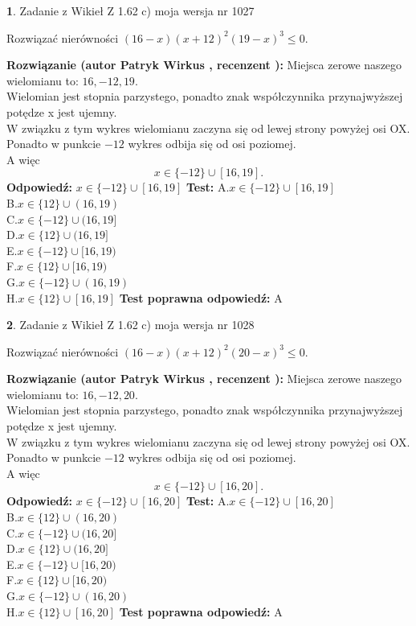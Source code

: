 \documentclass[12pt, a4paper]{article}
\theoremstyle{definition} %
\newtheorem{zad}{}
\newcommand{\zadStart}[1]{\begin{zad}#1\newline}
\newcommand{\zadStop}{\end{zad}}
\newcommand{\rozwStart}[2]{\noindent \textbf{Rozwiązanie (autor #1 , recenzent #2): }\newline}
\newcommand{\rozwStop}{\newline}
\newcommand{\odpStart}{\noindent \textbf{Odpowiedź:}\newline}
\newcommand{\odpStop}{\newline}
\newcommand{\testStart}{\noindent \textbf{Test:}\newline}
\newcommand{\testStop}{\newline}
\newcommand{\kluczStart}{\noindent \textbf{Test poprawna odpowiedź:}\newline}
\newcommand{\kluczStop}{\newline}
\begin{document}
\zadStart{Zadanie z Wikieł Z 1.62 c) moja wersja nr 1027}

Rozwiązać nierówności $(16-x)(x+12)^{2}(19-x)^{3}\le0$.
\zadStop
\rozwStart{Patryk Wirkus}{}
Miejsca zerowe naszego wielomianu to: $16, -12, 19$.\\
Wielomian jest stopnia parzystego, ponadto znak współczynnika przy\linebreak najwyższej potędze x jest ujemny.\\ W związku z tym wykres wielomianu zaczyna się od lewej strony powyżej osi OX.\\
Ponadto w punkcie $-12$ wykres odbija się od osi poziomej.\\
A więc $$x \in \{-12\} \cup [16,19].$$
\rozwStop
\odpStart
$x \in \{-12\} \cup [16,19]$
\odpStop
\testStart
A.$x \in \{-12\} \cup [16,19]$\\
B.$x \in \{12\} \cup (16,19)$\\
C.$x \in \{-12\} \cup (16,19]$\\
D.$x \in \{12\} \cup (16,19]$\\
E.$x \in \{-12\} \cup [16,19)$\\
F.$x \in \{12\} \cup [16,19)$\\
G.$x \in \{-12\} \cup (16,19)$\\
H.$x \in \{12\} \cup [16,19]$
\testStop
\kluczStart
A
\kluczStop



\zadStart{Zadanie z Wikieł Z 1.62 c) moja wersja nr 1028}

Rozwiązać nierówności $(16-x)(x+12)^{2}(20-x)^{3}\le0$.
\zadStop
\rozwStart{Patryk Wirkus}{}
Miejsca zerowe naszego wielomianu to: $16, -12, 20$.\\
Wielomian jest stopnia parzystego, ponadto znak współczynnika przy\linebreak najwyższej potędze x jest ujemny.\\ W związku z tym wykres wielomianu zaczyna się od lewej strony powyżej osi OX.\\
Ponadto w punkcie $-12$ wykres odbija się od osi poziomej.\\
A więc $$x \in \{-12\} \cup [16,20].$$
\rozwStop
\odpStart
$x \in \{-12\} \cup [16,20]$
\odpStop
\testStart
A.$x \in \{-12\} \cup [16,20]$\\
B.$x \in \{12\} \cup (16,20)$\\
C.$x \in \{-12\} \cup (16,20]$\\
D.$x \in \{12\} \cup (16,20]$\\
E.$x \in \{-12\} \cup [16,20)$\\
F.$x \in \{12\} \cup [16,20)$\\
G.$x \in \{-12\} \cup (16,20)$\\
H.$x \in \{12\} \cup [16,20]$
\testStop
\kluczStart
A
\kluczStop
\end{document}
